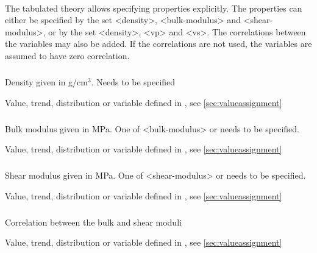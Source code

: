 {\paragraph{}
 \slist
   \item \Description The tabulated theory allows specifying properties explicitly. The properties can either be specified by the set <density>, <bulk-modulus> and <shear-modulus>, or by the set <density>, <vp> and <vs>. The correlations between the variables may also be added. If the correlations are not used, the variables are assumed to have zero correlation. 
   \item \Argument
   \item \Default 
 \elist

\subparagraph{}
 \slist
   \item \Description Density given in g/cm$^3$. Needs to be specified
   \item \Argument Value, trend, distribution or variable defined in , see \autoref{sec:valueassignment}
   \item \Default 
 \elist

\subparagraph{}
 \slist
   \item \Description Bulk modulus given in MPa. One of <bulk-modulus> or  needs to be specified.
   \item \Argument Value, trend, distribution or variable defined in , see \autoref{sec:valueassignment}
   \item \Default 
 \elist

\subparagraph{}
 \slist
   \item \Description Shear modulus given in MPa. One of <shear-modulus> or  needs to be specified.
   \item \Argument Value, trend, distribution or variable defined in , see \autoref{sec:valueassignment}
   \item \Default 
 \elist

\subparagraph{}
 \slist
   \item \Description Correlation between the bulk and shear moduli
   \item \Argument Value, trend, distribution or variable defined in , see \autoref{sec:valueassignment}
   \item {}
 \elist

}
